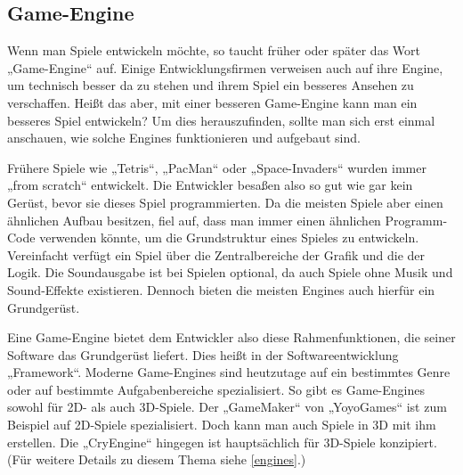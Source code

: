 \subsection{Game-Engine}	
\label{engine}
Wenn man Spiele entwickeln möchte, so taucht früher oder später das Wort „Game-Engine“ auf. Einige Entwicklungsfirmen verweisen auch auf ihre Engine, um technisch besser da zu stehen und ihrem Spiel ein besseres Ansehen zu verschaffen. Heißt das aber, mit einer besseren Game-Engine kann man ein besseres Spiel entwickeln? Um dies herauszufinden, sollte man sich erst einmal anschauen, wie solche Engines funktionieren und aufgebaut sind.

Frühere Spiele wie „Tetris“, „PacMan“ oder „Space-Invaders“ wurden immer „from scratch“  entwickelt. Die Entwickler besaßen also so gut wie gar kein Gerüst, bevor sie dieses Spiel programmierten. Da die meisten Spiele aber einen ähnlichen Aufbau besitzen, fiel auf, dass man immer einen ähnlichen Programm-Code verwenden könnte, um die Grundstruktur eines Spieles zu entwickeln. Vereinfacht verfügt ein Spiel über die Zentralbereiche der Grafik und die der Logik. Die Soundausgabe ist bei Spielen optional, da auch Spiele ohne Musik und Sound-Effekte existieren. Dennoch bieten die meisten Engines auch hierfür ein Grundgerüst.

Eine Game-Engine bietet dem Entwickler also diese Rahmenfunktionen, die seiner Software das Grundgerüst liefert. Dies heißt in der Softwareentwicklung „Framework“. 
Moderne Game-Engines sind heutzutage auf ein bestimmtes Genre oder auf bestimmte Aufgabenbereiche spezialisiert. So gibt es Game-Engines sowohl für 2D- als auch 3D-Spiele. Der „GameMaker“ von „YoyoGames“ ist zum Beispiel auf 2D-Spiele spezialisiert. Doch kann man auch Spiele in 3D mit ihm erstellen. Die „CryEngine“ hingegen ist hauptsächlich für 3D-Spiele konzipiert. (Für weitere Details zu diesem Thema siehe \ref{engines}.)
